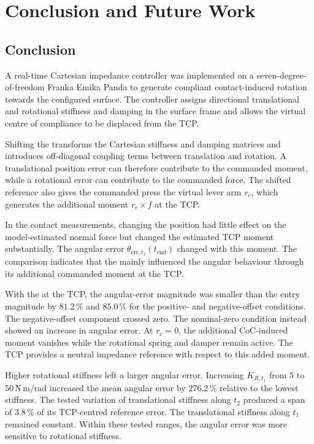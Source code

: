 \chapter{Conclusion and Future Work}
\label{ch:conclusion}

\section{Conclusion}
\label{sec:conclusion_summary}

A real-time Cartesian impedance controller was implemented on a
seven-degree-of-freedom Franka Emika Panda to generate compliant
contact-induced rotation towards the configured surface. The controller assigns
directional translational and rotational stiffness and damping in the surface
frame and allows the virtual centre of compliance to be displaced from the TCP.

Shifting the  transforms the Cartesian stiffness and damping matrices
and introduces off-diagonal coupling terms between translation and rotation. A
translational position error can therefore contribute to the commanded moment,
while a rotational error can contribute to the commanded force. The shifted
reference also gives the commanded press the virtual lever arm
\mbox{\(r_c\)}, which generates the additional moment
\mbox{\(r_c\times f\)} at the TCP.

In the contact measurements, changing the  position had little
effect on the model-estimated normal force but changed the estimated TCP
moment substantially. The angular error
\mbox{\(\theta_{\mathrm{err},t_1}(t_{\mathrm{end}})\)} changed with this moment.
The comparison indicates that the  mainly influenced the angular
behaviour through its additional commanded moment at the TCP.

With the  at the TCP, the angular-error magnitude was smaller
than the entry magnitude by \mbox{\(81.2\,\%\)} and \mbox{\(85.0\,\%\)}
for the positive- and negative-offset conditions.
The negative-offset component crossed zero.
The nominal-zero condition instead showed an increase in angular error.
At \mbox{\(r_c=0\)}, the additional CoC-induced moment vanishes while the
rotational spring and damper remain active. The TCP provides a neutral
impedance reference with respect to this added moment.

Higher rotational stiffness left a larger angular error.
Increasing \mbox{\(K_{R,t_1}\)} from \mbox{\(5\)} to
\mbox{\(50\,\mathrm{N\,m/rad}\)} increased the mean angular error by
\mbox{\(276.2\,\%\)} relative to the lowest stiffness.
The tested variation of translational stiffness along \mbox{\(t_2\)}
produced a span of \mbox{\(3.8\,\%\)} of its TCP-centred reference error.
The translational stiffness along \mbox{\(t_1\)} remained constant.
Within these tested ranges, the angular error was more sensitive to
rotational stiffness.

